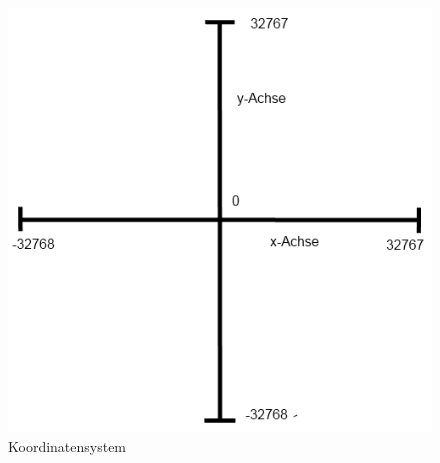 \begin{figure}[H]
\centering 
\includegraphics[scale=0.5]{src/koordinatensystem.png}
\caption{Koordinatensystem} %
\label{Koordinatensystem} %
\end{figure}

